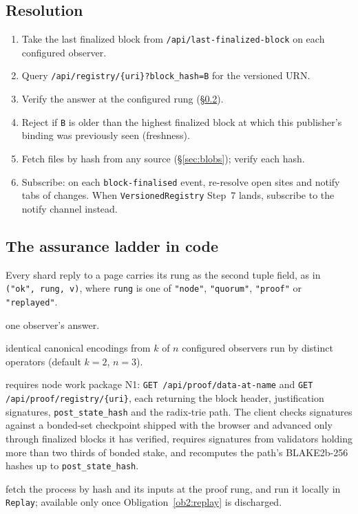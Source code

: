 \documentclass[11pt]{article}
\theoremstyle{definition}
\theoremstyle{remark}
\newcommand{\code}[1]{\texttt{#1}}
\begin{document}
\subsection{Resolution}
\begin{enumerate}[nosep]
\item Take the last finalized block from \code{/api/last-finalized-block} on each
  configured observer.
\item Query \code{/api/registry/\{uri\}?block\_hash=B} for the versioned URN.
\item Verify the answer at the configured rung (\S\ref{sec:ladder}).
\item Reject if \code{B} is older than the highest finalized block at which this
  publisher's binding was previously seen (freshness).
\item Fetch files by hash from any source (\S\ref{sec:blobs}); verify each hash.
\item Subscribe: on each \code{block-finalised} event, re-resolve open sites and
  notify tabs of changes. When \code{VersionedRegistry} Step~7 lands, subscribe to the
  notify channel instead.
\end{enumerate}

\subsection{The assurance ladder in code}\label{sec:ladder}
Every shard reply to a page carries its rung as the second tuple field, as in
\code{("ok", rung, v)}, where \code{rung} is one of \code{"node"}, \code{"quorum"},
\code{"proof"} or \code{"replayed"}.

\begin{description}[leftmargin=1.5em,style=nextline,itemsep=2pt]
\item[node] one observer's answer.
\item[quorum] identical canonical encodings from $k$ of $n$ configured observers
  run by distinct operators (default $k=2$, $n=3$).
\item[proof] requires node work package N1: \code{GET /api/proof/data-at-name} and
  \code{GET /api/proof/registry/\{uri\}}, each returning the block header,
  justification signatures, \code{post\_state\_hash} and the radix-trie path. The
  client checks signatures against a bonded-set checkpoint shipped with the browser
  and advanced only through finalized blocks it has verified, requires signatures
  from validators holding more than two thirds of bonded stake, and recomputes the
  path's BLAKE2b-256 hashes up to \code{post\_state\_hash}.
\item[replayed] fetch the process by hash and its inputs at the proof rung, and run
  it locally in \code{Replay}; available only once Obligation~\ref{ob2:replay} is
  discharged.
\end{description}
\end{document}
